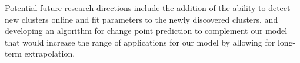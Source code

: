 \documentclass{article}
\begin{document}
Potential future research directions include the addition of the ability to detect new clusters online and fit parameters to the newly discovered clusters, and developing an algorithm for change point prediction to complement our model that would increase the range of applications for our model by allowing for long-term extrapolation.



\end{document}
